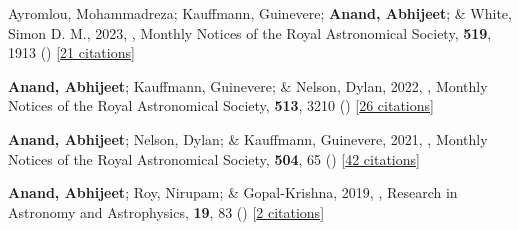 \item[{\color{numcolor}\scriptsize4}] Ayromlou, Mohammadreza; Kauffmann, Guinevere; \textbf{Anand, Abhijeet}; \& White, Simon D. M., 2023, , Monthly Notices of the Royal Astronomical Society, \textbf{519}, 1913 () [\href{https://ui.adsabs.harvard.edu/abs/2023MNRAS.519.1913A}{21 citations}]

\item[{\color{numcolor}\scriptsize3}] \textbf{Anand, Abhijeet}; Kauffmann, Guinevere; \& Nelson, Dylan, 2022, , Monthly Notices of the Royal Astronomical Society, \textbf{513}, 3210 () [\href{https://ui.adsabs.harvard.edu/abs/2022MNRAS.513.3210A}{26 citations}]

\item[{\color{numcolor}\scriptsize2}] \textbf{Anand, Abhijeet}; Nelson, Dylan; \& Kauffmann, Guinevere, 2021, , Monthly Notices of the Royal Astronomical Society, \textbf{504}, 65 () [\href{https://ui.adsabs.harvard.edu/abs/2021MNRAS.504...65A}{42 citations}]

\item[{\color{numcolor}\scriptsize1}] \textbf{Anand, Abhijeet}; Roy, Nirupam; \& Gopal-Krishna, 2019, , Research in Astronomy and Astrophysics, \textbf{19}, 83 () [\href{https://ui.adsabs.harvard.edu/abs/2019RAA....19...83A}{2 citations}]